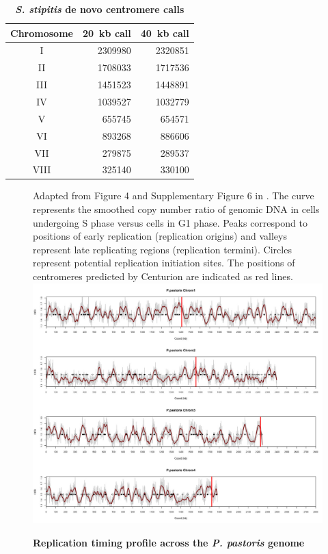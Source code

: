\begin{table}[ht!]
\caption{\textbf{\textit{S. stipitis} de novo centromere calls}}
\begin{center}
\begin{tabular}{c | r r}
\textbf{Chromosome} & \textbf{20~kb call} & \textbf{40~kb call} \\
\hline
I & \num[group-separator={\,}]{2309980} & \num[group-separator={\,}]{2320851} \\
II & \num[group-separator={\,}]{1708033} & \num[group-separator={\,}]{1717536} \\
III & \num[group-separator={\,}]{1451523} & \num[group-separator={\,}]{1448891} \\
IV & \num[group-separator={\,}]{1039527} & \num[group-separator={\,}]{1032779} \\
V & \num[group-separator={\,}]{655745} & \num[group-separator={\,}]{654571} \\
VI & \num[group-separator={\,}]{893268} & \num[group-separator={\,}]{886606} \\
VII & \num[group-separator={\,}]{279875} & \num[group-separator={\,}]{289537} \\
VIII & \num[group-separator={\,}]{325140} & \num[group-separator={\,}]{330100} \\
\end{tabular}
\end{center}
\end{table}

\clearpage

\begin{figure}[ht!]
\caption{\textbf{Replication timing profile across the \textit{P.
pastoris} genome}}{ Adapted from
Figure 4 and Supplementary Figure 6 in \citet{liachko:gc-rich}.  The
curve represents the smoothed copy number ratio of genomic DNA in cells
undergoing S phase versus cells in G1 phase.  Peaks correspond to positions of
early replication (replication origins) and valleys represent late replicating
regions (replication termini). Circles represent potential
replication initiation sites.  The positions of centromeres predicted by
Centurion are indicated as red lines.}
\includegraphics[width=0.9\linewidth]{figures/supp/Ppas_timing_CENs.jpg}
\label{suppfig:ppas_timing}
\end{figure}


